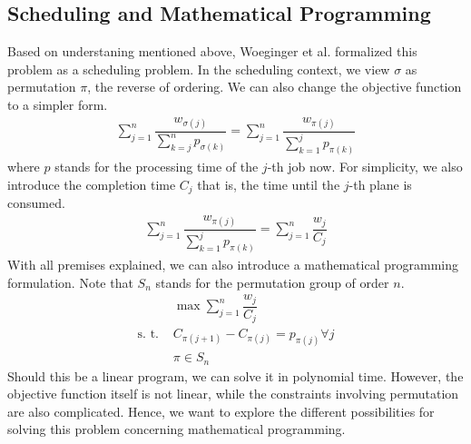 \documentclass[12pt,letterpaper]{article}
\begin{document}
\subsection{Scheduling and Mathematical Programming}
Based on understaning mentioned above, Woeginger et al. formalized this problem as a scheduling problem. \cite{woeginger2010scheduling}
In the scheduling context, we view $\sigma$ as permutation $\pi$, the reverse of ordering.
We can also change the objective function to a simpler form. 
\begin{align*}
    \sum_{j=1}^{n} \dfrac{w_{\sigma(j)}}{\sum_{k = j}^n p_{\sigma(k)}} = \sum_{j = 1}^n \dfrac{w_{\pi(j)}}{\sum_{k = 1}^j p_{\pi(k)}}
\end{align*}
where $p$ stands for the processing time of the $j$-th job now. 
For simplicity, we also introduce the completion time $C_j$
that is, 
the time until the $j$-th plane is consumed.
\begin{align*}
    \sum_{j = 1}^n \dfrac{w_{\pi(j)}}{\sum_{k = 1}^j p_{\pi(k)}} =  \sum_{j = 1}^n \dfrac{w_{j}}{C_j}
\end{align*}
With all premises explained, we can also introduce a mathematical programming formulation. Note that $S_n$ stands for the permutation group of order $n$. 
\begin{align}
    &\max \sum_{j = 1}^n \dfrac{w_j}{C_j} \label{eq:mathprog} \tag{A} \\ 
    \text{s. t.\ }& C_{\pi(j+1)} - C_{\pi(j)} = p_{\pi(j)} \forall j \nonumber \\
    & \pi \in S_n \nonumber
\end{align}
Should this be a linear program, we can solve it in polynomial time. However, the objective function 
itself is not linear, while the constraints involving permutation are also complicated. 
Hence, we want to explore the different possibilities for solving this problem concerning mathematical programming. 
\end{document}
